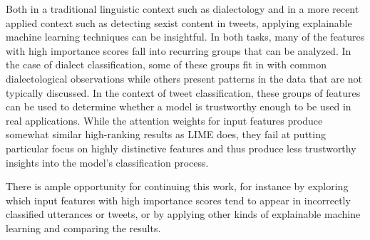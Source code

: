 \label{chap:conclusion}

Both in a traditional linguistic context such as dialectology and in a more recent applied context such as detecting sexist content in tweets, applying explainable machine learning techniques can be insightful.
In both tasks, many of the features with high importance scores fall into recurring groups that can be analyzed.
In the case of dialect classification, some of these groups fit in with common dialectological observations while others present patterns in the data that are not typically discussed.
In the context of tweet classification, these groups of features can be used to determine whether a model is trustworthy enough to be used in real applications.
While the attention weights for input features produce somewhat similar high-ranking results as LIME does, they fail at putting particular focus on highly distinctive features and thus produce less trustworthy insights into the model's classification process.

There is ample opportunity for continuing this work, for instance by exploring which input features with high importance scores tend to appear in incorrectly classified utterances or tweets, or by applying other kinds of explainable machine learning and comparing the results.
